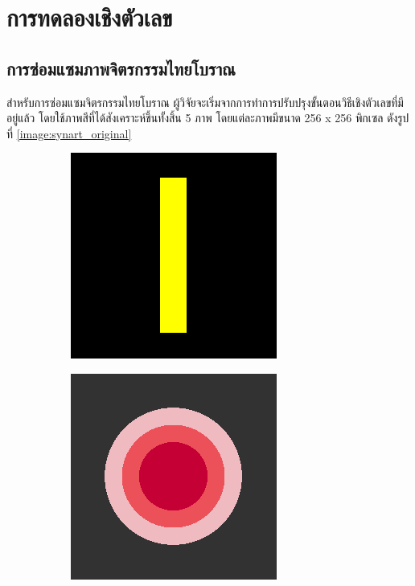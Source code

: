 \chapter{การทดลองเชิงตัวเลข}
\section{การซ่อมแซมภาพจิตรกรรมไทยโบราณ}
\hspace{1cm} สำหรับการซ่อมแซมจิตรกรรมไทยโบราณ ผู้วิจัยจะเริ่มจากการทำการปรับปรุงขั้นตอนวิธีเชิงตัวเลขที่มีอยู่แล้ว โดยใช้ภาพสีที่ได้สังเคราะห์ขึ้นทั้งสิ้น 5 ภาพ โดยแต่ละภาพมีขนาด 256 x 256 พิกเซล ดังรูปที่ \ref{image:synart_original}

\begin{figure}[H]
    \centering
    \begin{subfigure}{0.4\linewidth}
        \centering
        \includegraphics[width=0.8\linewidth]{image/image_inpaint_synthetic/case01-original.png}
    \end{subfigure}
    \begin{subfigure}{0.4\linewidth}
        \centering
        \includegraphics[width=0.8\linewidth]{image/image_inpaint_synthetic/case02-original.png}

\end{subfigure}
\end{figure}
